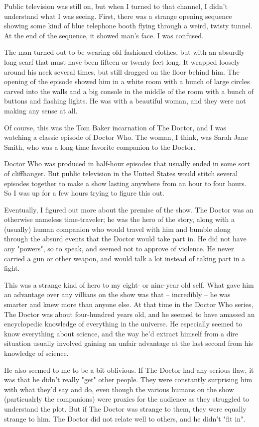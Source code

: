 \documentclass[
a4paper, %
11pt, %
onecolumn, %
openany, %
]{memoir}
\begin{document}
Public television was still on, but when I turned to that channel, I didn't understand what I was seeing. First, there was a strange opening sequence showing some kind of blue telephone booth flying through a weird, twisty tunnel. At the end of the sequence, it showed man's face. I was confused.

The man turned out to be wearing old-fashioned clothes, but with an absurdly long scarf that must have been fifteen or twenty feet long. It wrapped loosely around his neck several times, but still dragged on the floor behind him. The opening of the episode showed him in a white room with a bunch of large circles carved into the walls and a big console in the middle of the room with a bunch of buttons and flashing lights. He was with a beautiful woman, and they were not making any sense at all.

Of course, this was the Tom Baker incarnation of The Doctor, and I was watching a classic episode of Doctor Who. The woman, I think, was Sarah Jane Smith, who was a long-time favorite companion to the Doctor.

Doctor Who was produced in half-hour episodes that usually ended in some sort of cliffhanger. But public television in the United States would stitch several episodes together to make a show lasting anywhere from an hour to four hours. So I was up for a few hours trying to figure this out.

Eventually, I figured out more about the premise of the show. The Doctor was an otherwise nameless time-traveler; he was the hero of the story, along with a (usually) human companion who would travel with him and bumble along through the absurd events that the Doctor would take part in. He did not have any "powers", so to speak, and seemed not to approve of violence. He never carried a gun or other weapon, and would talk a lot instead of taking part in a fight.

This was a strange kind of hero to my eight- or nine-year old self. What gave him an advantage over any villians on the show was that -- incredibly -- he was smarter and knew more than anyone else. At that time in the Doctor Who series, The Doctor was about four-hundred years old, and he seemed to have amassed an encyclopedic knowledge of everything in the universe. He especially seemed to know everything about science, and the way he'd extract himself from a dire situation usually involved gaining an unfair advantage at the last second from his knowledge of science.

He also seemed to me to be a bit oblivious. If The Doctor had any serious flaw, it was that he didn't really "get" other people. They were constantly surprising him with what they'd say and do, even though the various humans on the show (particualrly the companions) were proxies for the audience as they struggled to understand the plot. But if The Doctor was strange to them, they were equally strange to him. The Doctor did not relate well to others, and he didn't "fit in".
\end{document}
